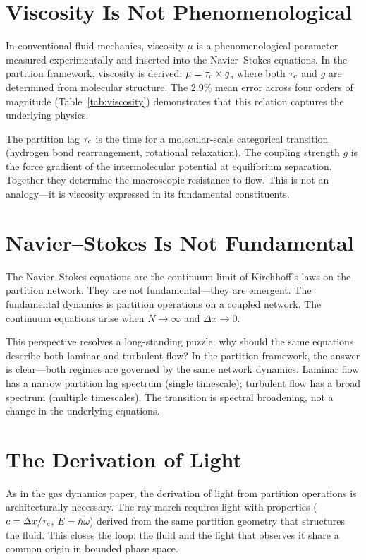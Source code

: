 \section{Viscosity Is Not Phenomenological}
\label{sec:visc_discuss}

In conventional fluid mechanics, viscosity $\mu$ is a phenomenological parameter measured experimentally and inserted into the Navier--Stokes equations. In the partition framework, viscosity is derived: $\mu = \tau_c \times g$, where both $\tau_c$ and $g$ are determined from molecular structure. The 2.9\% mean error across four orders of magnitude (Table~\ref{tab:viscosity}) demonstrates that this relation captures the underlying physics.

The partition lag $\tau_c$ is the time for a molecular-scale categorical transition (hydrogen bond rearrangement, rotational relaxation). The coupling strength $g$ is the force gradient of the intermolecular potential at equilibrium separation. Together they determine the macroscopic resistance to flow. This is not an analogy---it is viscosity expressed in its fundamental constituents.

\section{Navier--Stokes Is Not Fundamental}
\label{sec:ns_discuss}

The Navier--Stokes equations are the continuum limit of Kirchhoff's laws on the partition network. They are not fundamental---they are emergent. The fundamental dynamics is partition operations on a coupled network. The continuum equations arise when $N \to \infty$ and $\Delta x \to 0$.

This perspective resolves a long-standing puzzle: why should the same equations describe both laminar and turbulent flow? In the partition framework, the answer is clear---both regimes are governed by the same network dynamics. Laminar flow has a narrow partition lag spectrum (single timescale); turbulent flow has a broad spectrum (multiple timescales). The transition is spectral broadening, not a change in the underlying equations.

\section{The Derivation of Light}
\label{sec:light_discuss}

As in the gas dynamics paper, the derivation of light from partition operations is architecturally necessary. The ray march requires light with properties ($c = \Delta x/\tau_c$, $E = \hbar\omega$) derived from the same partition geometry that structures the fluid. This closes the loop: the fluid and the light that observes it share a common origin in bounded phase space.

